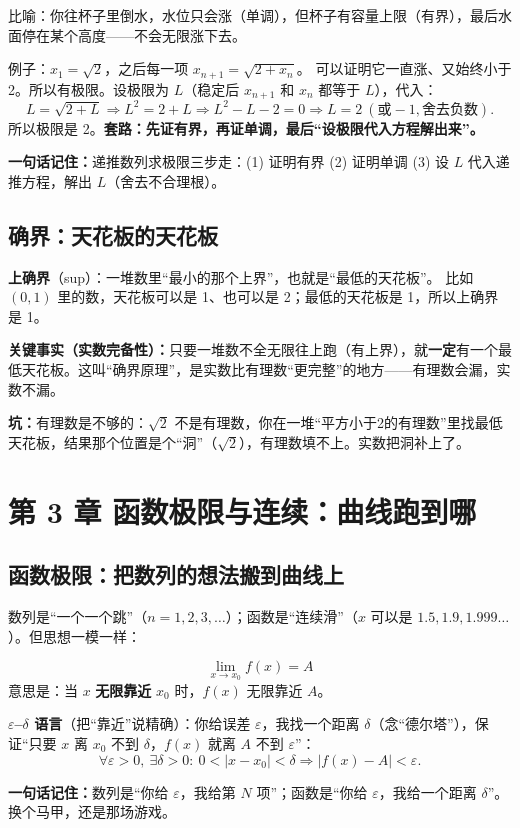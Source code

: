 ﻿\documentclass[11pt,a4paper,UTF8]{ctexart}
\newcommand{\eps}{\varepsilon}
\newcommand{\idea}[1]{\par\smallskip\noindent\colorbox{yellow!22}{\textbf{一句话记住：}#1}\par\smallskip}
\newcommand{\warn}[1]{\par\smallskip\noindent\textcolor{red!70!black}{\textbf{坑：}#1}\par\smallskip}
\begin{document}
比喻：你往杯子里倒水，水位只会涨（单调），但杯子有容量上限（有界），最后水面停在某个高度——不会无限涨下去。

例子：$x_1=\sqrt2$，之后每一项 $x_{n+1}=\sqrt{2+x_n}$。
可以证明它一直涨、又始终小于 2。所以有极限。设极限为 $L$（稳定后 $x_{n+1}$ 和 $x_n$ 都等于 $L$），代入：
$$L=\sqrt{2+L}\Rightarrow L^2=2+L\Rightarrow L^2-L-2=0\Rightarrow L=2\ (\text{或}-1,\text{舍去负数}).$$
所以极限是 2。\textbf{套路：先证有界，再证单调，最后“设极限代入方程解出来”。}

\idea{递推数列求极限三步走：(1) 证明有界 (2) 证明单调 (3) 设 $L$ 代入递推方程，解出 $L$（舍去不合理根）。}

\subsection{确界：天花板的天花板}

\textbf{上确界}（sup）：一堆数里“最小的那个上界”，也就是“最低的天花板”。
比如 $(0,1)$ 里的数，天花板可以是 1、也可以是 2；最低的天花板是 1，所以上确界是 1。

\textbf{关键事实（实数完备性）：}只要一堆数不全无限往上跑（有上界），就\textbf{一定}有一个最低天花板。这叫“确界原理”，是实数比有理数“更完整”的地方——有理数会漏，实数不漏。

\warn{有理数是不够的：$\sqrt2$ 不是有理数，你在一堆“平方小于2的有理数”里找最低天花板，结果那个位置是个“洞”（$\sqrt2$），有理数填不上。实数把洞补上了。}

\section{第 3 章 函数极限与连续：曲线跑到哪}

\subsection{函数极限：把数列的想法搬到曲线上}

数列是“一个一个跳”（$n=1,2,3,\dots$）；函数是“连续滑”（$x$ 可以是 $1.5,1.9,1.999\dots$）。但思想一模一样：

$$\lim_{x\to x_0}f(x)=A$$
意思是：当 $x$ \textbf{无限靠近} $x_0$ 时，$f(x)$ 无限靠近 $A$。

\textbf{$\eps$--$\delta$ 语言}（把“靠近”说精确）：你给误差 $\eps$，我找一个距离 $\delta$（念“德尔塔”），保证“只要 $x$ 离 $x_0$ 不到 $\delta$，$f(x)$ 就离 $A$ 不到 $\eps$”：
$$\forall\eps>0,\ \exists\delta>0:\ 0<|x-x_0|<\delta\Rightarrow|f(x)-A|<\eps.$$

\idea{数列是“你给 $\eps$，我给第 $N$ 项”；函数是“你给 $\eps$，我给一个距离 $\delta$”。换个马甲，还是那场游戏。}
\end{document}
